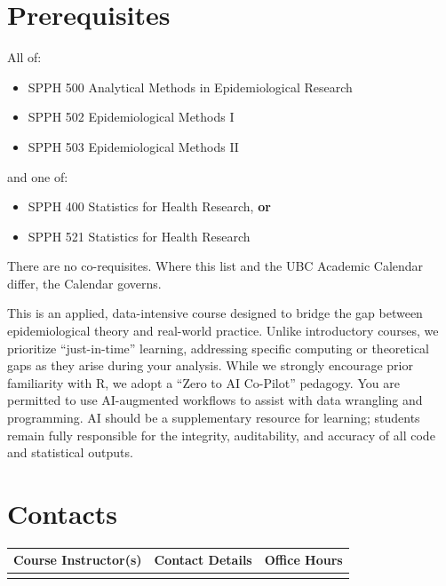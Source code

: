 \documentclass[
]{article}
\providecommand{\tightlist}{%
  \setlength{\itemsep}{0pt}\setlength{\parskip}{0pt}}
\begin{document}
\section{Prerequisites}\label{prerequisites}

All of:

\begin{itemize}
\tightlist
\item
  SPPH 500 Analytical Methods in Epidemiological Research
\item
  SPPH 502 Epidemiological Methods I
\item
  SPPH 503 Epidemiological Methods II
\end{itemize}

and one of:

\begin{itemize}
\tightlist
\item
  SPPH 400 Statistics for Health Research, \textbf{or}
\item
  SPPH 521 Statistics for Health Research
\end{itemize}

There are no co-requisites. Where this list and the UBC Academic
Calendar differ, the Calendar governs.

This is an applied, data-intensive course designed to bridge the gap
between epidemiological theory and real-world practice. Unlike
introductory courses, we prioritize ``just-in-time'' learning,
addressing specific computing or theoretical gaps as they arise during
your analysis. While we strongly encourage prior familiarity with R, we
adopt a ``Zero to AI Co-Pilot'' pedagogy. You are permitted to use
AI-augmented workflows to assist with data wrangling and programming. AI
should be a supplementary resource for learning; students remain fully
responsible for the integrity, auditability, and accuracy of all code
and statistical outputs.

\section{Contacts}\label{contacts}

\begin{table}[H]
\centering
\begin{tabular}[t]{>{\raggedright\arraybackslash}p{4cm}>{\raggedright\arraybackslash}p{5cm}>{\raggedright\arraybackslash}p{5cm}}
\toprule
Course Instructor(s) & Contact Details & Office Hours\\
\midrule
\cellcolor{gray!10}{\href{http://www.ehsank.com/}{Dr. M. Ehsan Karim}} & \cellcolor{gray!10}{ehsan dot karim at ubc dot ca \newline The typical response time is within 48 hours on weekdays.} & \cellcolor{gray!10}{By appointments, or as posted on canvas.}\\
\bottomrule
\end{tabular}
\end{table}
\end{document}
